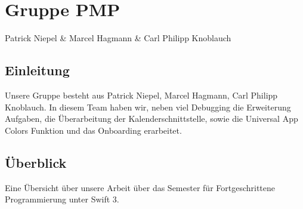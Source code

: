 
\chapter{Gruppe PMP}
Patrick Niepel \& Marcel Hagmann \& Carl Philipp Knoblauch

\section{Einleitung}
Unsere Gruppe besteht aus Patrick Niepel, Marcel Hagmann, Carl Philipp Knoblauch. In diesem Team haben wir, neben viel Debugging die Erweiterung Aufgaben, die Überarbeitung der Kalenderschnittstelle, sowie die Universal App Colors Funktion und das Onboarding erarbeitet.

\section{Überblick}
Eine Übersicht über unsere Arbeit über das Semester für Fortgeschrittene Programmierung unter Swift 3.

